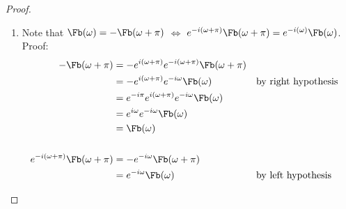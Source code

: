 \begin{proof}
\begin{enumerate}
\begin{enumerate}
      \item Note that $\Fb(\omega)=-\Fb(\omega+\pi)$ $\iff$ $e^{-i(\omega+\pi)}\Fb(\omega+\pi)=e^{-i(\omega)}\Fb(\omega)$. Proof:
        \begin{align*}
          -\Fb(\omega+\pi)
            &= -e^{i(\omega+\pi)}e^{-i(\omega+\pi)}\Fb(\omega+\pi)
          \\&= -e^{i(\omega+\pi)}e^{-i\omega}\Fb(\omega)
            && \text{by right hypothesis}
          \\&= e^{-i\pi}e^{i(\omega+\pi)}e^{-i\omega}\Fb(\omega)
          \\&= e^{i\omega}e^{-i\omega}\Fb(\omega)
          \\&= \Fb(\omega)
          \\
          \\
          e^{-i(\omega+\pi)}\Fb(\omega+\pi)
            &= -e^{-i\omega}\Fb(\omega+\pi)
          \\&= e^{-i\omega}\Fb(\omega)
            && \text{by left hypothesis}
        \end{align*}


\end{enumerate}
\end{enumerate}
\end{proof}
